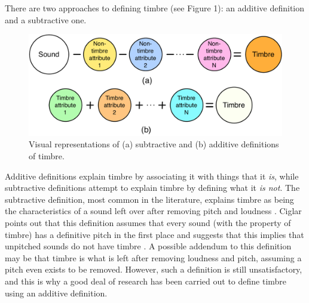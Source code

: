 \documentclass[12pt]{report} 	%
\numberwithin{figure}{chapter}
\numberwithin{table}{chapter}
\numberwithin{equation}{chapter}
\begin{document}
\begin{flushleft}
There are two approaches to defining timbre (see Figure 1): an additive definition and a subtractive one. 
\begin{figure}[!htp]
\begin{center}
\includegraphics[scale=0.45]{SubtractiveVsAdditive}
\caption[Subtractive vs. additive timbre definitions]{Visual representations of (a) subtractive and (b) additive definitions of timbre.}
\end{center}
\end{figure}
Additive definitions explain timbre by associating it with things that it \textit{is}, while subtractive definitions attempt to explain timbre by defining what it \textit{is not}. The subtractive definition, most common in the literature, explains timbre as being the characteristics of a sound left over after removing pitch and loudness \cite[p. 45]{Wessel:1979tg} \cite[p. 225]{Toiviainen:1998hs}. Ciglar points out that this definition assumes that every sound (with the property of timbre) has a definitive pitch in the first place and suggests that this implies that unpitched sounds do not have timbre \cite[p. 7]{Ciglar:2009uf}. A possible addendum to this definition may be that timbre is what is left after removing loudness and pitch, assuming a pitch even exists to be removed. However, such a definition is still unsatisfactory, and this is why a good deal of research has been carried out to define timbre using an additive definition.


\end{flushleft}
\end{document}
